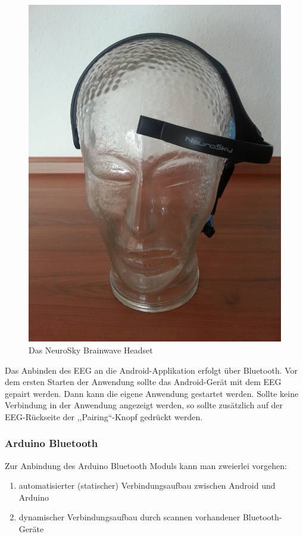 \documentclass[10pt, a4paper, oneside, titlepage]{scrartcl} %
\begin{document}
	\begin{figure}[h!btp]
	\centering
	\includegraphics[scale=0.07]{img/NeuroSkyHeadset.jpg}
	\caption{Das NeuroSky Brainwave Headset}
	\label{fig:Brainwave-Headset}
	\end{figure}
	
	Das Anbinden des EEG an die Android-Applikation erfolgt über Bluetooth. Vor dem ersten Starten der Anwendung sollte das Android-Gerät mit dem EEG gepairt werden. Dann kann die eigene Anwendung gestartet werden. Sollte keine Verbindung in der Anwendung angezeigt werden, so sollte zusätzlich auf der EEG-Rückseite der ,,Pairing``-Knopf gedrückt werden.
	
	\subsubsection{Arduino Bluetooth}
			
	Zur Anbindung des Arduino Bluetooth Moduls kann man zweierlei vorgehen:
	\begin{enumerate}
	\item automatisierter (statischer) Verbindungsaufbau zwischen Android und Arduino
	\item dynamischer Verbindungsaufbau durch scannen vorhandener Bluetooth-Geräte
	\end{enumerate}
	
\end{document}
